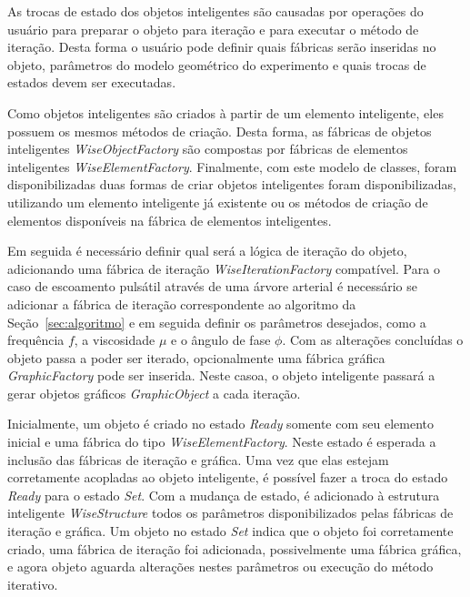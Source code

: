 As trocas de estado dos objetos inteligentes são causadas por operações do usuário para preparar o objeto para iteração e para executar o método de iteração. Desta forma o usuário pode definir quais fábricas serão inseridas no objeto, parâmetros do modelo geométrico do experimento e quais trocas de estados devem ser executadas.

Como objetos inteligentes são criados à partir de um elemento inteligente, eles possuem os mesmos métodos de criação. Desta forma, as fábricas de objetos inteligentes \textit{WiseObjectFactory} são compostas por fábricas de elementos inteligentes \textit{WiseElementFactory}. Finalmente, com este modelo de classes, foram disponibilizadas duas formas de criar objetos inteligentes foram disponibilizadas, utilizando um elemento inteligente já existente ou os métodos de criação de elementos disponíveis na fábrica de elementos inteligentes.

Em seguida é necessário definir qual será a lógica de iteração do objeto, adicionando uma fábrica de iteração \textit{WiseIterationFactory} compatível. Para o caso de escoamento pulsátil através de uma árvore arterial é necessário se adicionar a fábrica de iteração correspondente ao algoritmo da Seção~\ref{sec:algoritmo} e em seguida definir os parâmetros desejados, como a frequência $f$, a viscosidade $\mu$ e o ângulo de fase $\phi$. Com as alterações concluídas o objeto passa a poder ser iterado, opcionalmente uma fábrica gráfica \textit{GraphicFactory} pode ser inserida. Neste casoa, o objeto inteligente passará a gerar objetos gráficos \textit{GraphicObject} a cada iteração.

Inicialmente, um objeto é criado no estado \textit{Ready} somente com seu elemento inicial e uma fábrica do tipo \textit{WiseElementFactory}. Neste estado é esperada a inclusão das fábricas de iteração e gráfica. Uma vez que elas estejam corretamente acopladas ao objeto inteligente, é possível fazer a troca do estado \textit{Ready} para o estado \textit{Set}. Com a mudança de estado, é adicionado à estrutura inteligente \textit{WiseStructure} todos os parâmetros disponibilizados pelas fábricas de iteração e gráfica. Um objeto no estado \textit{Set} indica que o objeto foi corretamente criado, uma fábrica de iteração foi adicionada, possivelmente uma fábrica gráfica, e agora objeto aguarda alterações nestes parâmetros ou execução do método iterativo.

